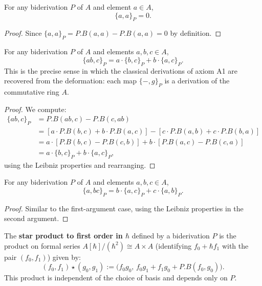 \begin{theorem}
For any biderivation $P$ of $A$ and element $a \in A$,
\[
\{a, a\}_P = 0 .
\]
\begin{proof}
Since $\{a,a\}_P = P.B(a,a) - P.B(a,a) = 0$ by definition.
\end{proof}
\end{theorem}

\begin{theorem}
For any biderivation $P$ of $A$ and elements $a, b, c \in A$,
\[
\{ab, c\}_P = a \cdot \{b,c\}_P + b \cdot \{a,c\}_P .
\]
This is the precise sense in which the classical derivations of axiom A1 are recovered from the deformation: each map $\{-, g\}_P$ is a derivation of the commutative ring $A$.
\begin{proof}
We compute:
\begin{align}
\{ab, c\}_P &= P.B(ab,c) - P.B(c,ab) \\
&= [a \cdot P.B(b,c) + b \cdot P.B(a,c)] - [c \cdot P.B(a,b) + c \cdot P.B(b,a)] \\
&= a \cdot [P.B(b,c) - P.B(c,b)] + b \cdot [P.B(a,c) - P.B(c,a)] \\
&= a \cdot \{b,c\}_P + b \cdot \{a,c\}_P ,
\end{align}
using the Leibniz properties and rearranging.
\end{proof}
\end{theorem}

\begin{theorem}
For any biderivation $P$ of $A$ and elements $a, b, c \in A$,
\[
\{a, bc\}_P = b \cdot \{a,c\}_P + c \cdot \{a,b\}_P .
\]
\begin{proof}
Similar to the first-argument case, using the Leibniz properties in the second argument.
\end{proof}
\end{theorem}

\begin{definition}
The \textbf{star product to first order in $\hbar$} defined by a biderivation $P$ is the product on formal series $A[\hbar]/(\hbar^2) \cong A \times A$ (identifying $f_0 + \hbar f_1$ with the pair $(f_0, f_1)$) given by:
\[
(f_0, f_1) \star (g_0, g_1) := \bigl(f_0 g_0, \, f_0 g_1 + f_1 g_0 + P.B(f_0, g_0)\bigr) .
\]
This product is independent of the choice of basis and depends only on $P$.
\end{definition}

